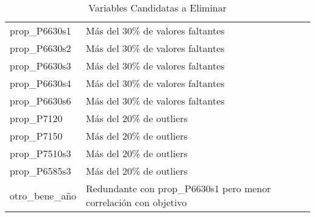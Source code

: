 \begin{table}[ht]
\begin{tabular}{ll}
  prop\_P6630s1 & Más del 30\% de valores faltantes \\ 
  prop\_P6630s2 & Más del 30\% de valores faltantes \\ 
  prop\_P6630s3 & Más del 30\% de valores faltantes \\ 
  prop\_P6630s4 & Más del 30\% de valores faltantes \\ 
  prop\_P6630s6 & Más del 30\% de valores faltantes \\ 
  prop\_P7120 & Más del 20\% de outliers \\ 
  prop\_P7150 & Más del 20\% de outliers \\ 
  prop\_P7510s3 & Más del 20\% de outliers \\ 
  prop\_P6585s3 & Más del 20\% de outliers \\ 
  otro\_bene\_año & Redundante con prop\_P6630s1 pero menor correlación con objetivo \\ 
   \bottomrule
\end{tabular}
\caption{Variables Candidatas a Eliminar} 
\label{tab:variables_eliminar}
\end{table}
